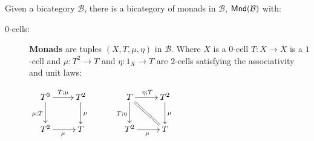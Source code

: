 \begin{definition}
\label{def:monad}
Given a bicategory $\mathcal B$, there is a bicategory of monads in $\mathcal B$, ${\sf Mnd}({\mathcal B})$ with:
\begin{description}
\item[0-cells:]
{\bf Monads} are tuples $(X,T,\mu,\eta)$ in $\mathcal B$.  Where $X$ is a $0$-cell $T:X\to X$ is a $1$-cell and  $\mu:T^2 \to T$ and $\eta:1_X\to T$ are $2$-cells satisfying the associativity and unit laws:

\hfil$
\xymatrix{
T^3 \ar[r]^{T;\mu} \ar[d]_{\mu; T}
  & T^2 \ar[d]^\mu\\
T^2\ar[r]_{\mu} & T
}
\hspace*{1cm}
\xymatrix{
T \ar[r]^{\eta; T} \ar[d]_{ T;\eta} \ar@{=}[dr] & T^2 \ar[d]^\mu\\
T^2 \ar[r]_{\mu} & T
}
$


\end{description}
\end{definition}
